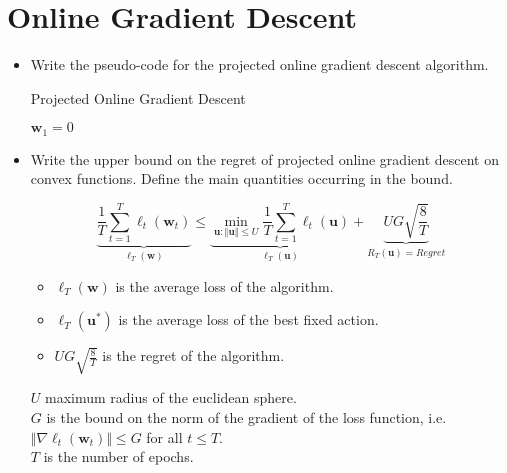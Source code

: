 \newpage
\section{Online Gradient Descent}

\begin{itemize}

    \item Write the pseudo-code for the projected online gradient descent algorithm. 

    \begin{algorithm}[H]
        \SetAlgoLined
        \DontPrintSemicolon
        \caption{Projected Online Gradient Descent}
        $\boldsymbol{w}_1 = 0$\\
    \end{algorithm}

    \item Write the upper bound on the regret of projected online gradient descent on convex functions. Define the main quantities occurring in the bound.

        $$
        \underbrace{\frac{1}{T} \sum_{t=1}^{T} \ell_{t}(\boldsymbol{w}_{t})}_{\ell_T(\boldsymbol{w})} \leq \underbrace{\min_{\boldsymbol{u} : \Vert \boldsymbol{u} \Vert \leq U} \frac{1}{T} \sum_{t=1}^{T} \ell_{t}(\boldsymbol{u})}_{\ell_T(\boldsymbol{u})} + \underbrace{UG \sqrt{\frac{8}{T}}}_{R_T(\boldsymbol{u}) = Regret}
        $$

        \begin{itemize}
            \item $\ell_T(\boldsymbol{w})$ is the average loss of the algorithm.
            \item $\ell_T(\boldsymbol{u^*})$ is the average loss of the best fixed action.
            \item $UG \sqrt{\frac{8}{T}}$ is the regret of the algorithm.
        \end{itemize}
        
        $U$ maximum radius of the euclidean sphere.\\
        $G$ is the bound on the norm of the gradient of the loss function, i.e. $\Vert \nabla \ell_{t}(\boldsymbol{w}_{t}) \Vert \leq G$ for all $t \leq T$.\\
        $T$ is the number of epochs.\\


\end{itemize}
